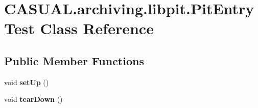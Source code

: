 \hypertarget{class_c_a_s_u_a_l_1_1archiving_1_1libpit_1_1_pit_entry_test}{\section{C\-A\-S\-U\-A\-L.\-archiving.\-libpit.\-Pit\-Entry\-Test Class Reference}
\label{class_c_a_s_u_a_l_1_1archiving_1_1libpit_1_1_pit_entry_test}
}
\subsection*{Public Member Functions}
\begin{DoxyCompactItemize}
\item 
\hypertarget{class_c_a_s_u_a_l_1_1archiving_1_1libpit_1_1_pit_entry_test_ac3552eee5a02ebb59a6fd296288c3075}{void {\bfseries set\-Up} ()}\label{class_c_a_s_u_a_l_1_1archiving_1_1libpit_1_1_pit_entry_test_ac3552eee5a02ebb59a6fd296288c3075}

\item 
\hypertarget{class_c_a_s_u_a_l_1_1archiving_1_1libpit_1_1_pit_entry_test_a61a321acfe86cca8e9704e5b23e69724}{void {\bfseries tear\-Down} ()}\label{class_c_a_s_u_a_l_1_1archiving_1_1libpit_1_1_pit_entry_test_a61a321acfe86cca8e9704e5b23e69724}


\end{DoxyCompactItemize}
